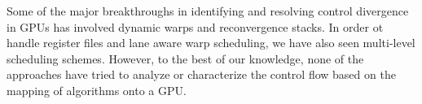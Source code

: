 
Some of the major breakthroughs in identifying and resolving control divergence in GPUs has involved dynamic warps and reconvergence stacks\cite{dynamic-warps}. In order ot handle register files and lane aware warp scheduling, we have also seen multi-level scheduling schemes\cite{warp-scheduling}. However, to the best of our knowledge, none of the approaches have tried to analyze or characterize the control flow based on the mapping of algorithms onto a GPU.
